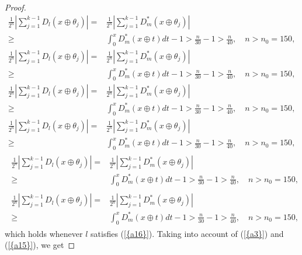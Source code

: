 \documentclass{amsart}
\numberwithin{equation}{section}
\begin{document}
\begin{proof}
{\begin{gather*}\label{a15}
\frac{1}{2^{n}}\left|\sum_{j=1}^{k-1}D_l(x\oplus\theta_j)\right|=&\frac{1}{2^{n}}\left|\sum_{j=1}^{k-1}D_m^*(x\oplus\theta_j)\right|\\
\ge &\int_0^xD_m^*(x\oplus t)dt-1>\frac{n}{30}-1>\frac{n}{40},\quad n>n_0=150,
\end{gather*}\fi  
{}\begin{gather}\label{a15}
\frac{1}{2^{n}}\left|\sum_{j=1}^{k-1}D_l(x\oplus\theta_j)\right|=&\frac{1}{2^{n}}\left|\sum_{j=1}^{k-1}D_m^*(x\oplus\theta_j)\right|\\
\ge &\int_0^xD_m^*(x\oplus t)dt-1>\frac{n}{30}-1>\frac{n}{40},\quad n>n_0=150,
\end{gather}\fi   
{}\begin{multline*}\label{a15}
\frac{1}{2^{n}}\left|\sum_{j=1}^{k-1}D_l(x\oplus\theta_j)\right|=&\frac{1}{2^{n}}\left|\sum_{j=1}^{k-1}D_m^*(x\oplus\theta_j)\right|\\
\ge &\int_0^xD_m^*(x\oplus t)dt-1>\frac{n}{30}-1>\frac{n}{40},\quad n>n_0=150,
\end{multline*}\fi  
{}\begin{multline}\label{a15}
\frac{1}{2^{n}}\left|\sum_{j=1}^{k-1}D_l(x\oplus\theta_j)\right|=&\frac{1}{2^{n}}\left|\sum_{j=1}^{k-1}D_m^*(x\oplus\theta_j)\right|\\
\ge &\int_0^xD_m^*(x\oplus t)dt-1>\frac{n}{30}-1>\frac{n}{40},\quad n>n_0=150,
\end{multline}\fi  
{}\begin{multline*}\begin{split}\label{a15}
\frac{1}{2^{n}}\left|\sum_{j=1}^{k-1}D_l(x\oplus\theta_j)\right|=&\frac{1}{2^{n}}\left|\sum_{j=1}^{k-1}D_m^*(x\oplus\theta_j)\right|\\
\ge &\int_0^xD_m^*(x\oplus t)dt-1>\frac{n}{30}-1>\frac{n}{40},\quad n>n_0=150,
\end{split}\end{multline*}\fi
{}\begin{multline}\begin{split}\label{a15}
\frac{1}{2^{n}}\left|\sum_{j=1}^{k-1}D_l(x\oplus\theta_j)\right|=&\frac{1}{2^{n}}\left|\sum_{j=1}^{k-1}D_m^*(x\oplus\theta_j)\right|\\
\ge &\int_0^xD_m^*(x\oplus t)dt-1>\frac{n}{30}-1>\frac{n}{40},\quad n>n_0=150,
\end{split}\end{multline}\fi
}
which holds whenever $l$ satisfies {(\ref{{a16}})}.
Taking into account of {(\ref{{a3}})} and {(\ref{{a15}})}, we get

\end{proof}
\end{document}
